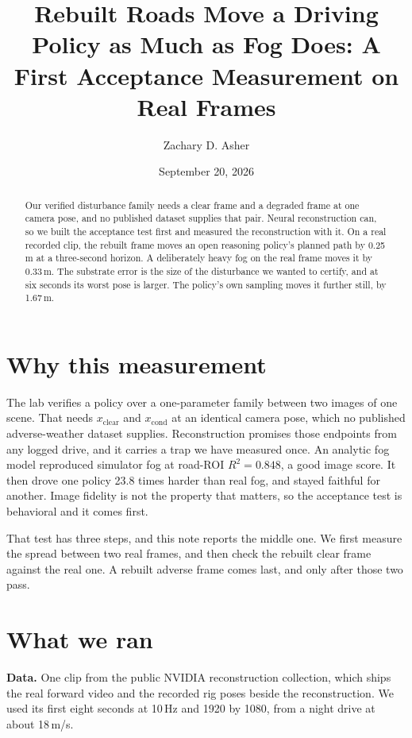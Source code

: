 \documentclass[10pt,twocolumn]{article}
\title{\bfseries\large Rebuilt Roads Move a Driving Policy as Much as Fog Does:
A First Acceptance Measurement on Real Frames}
\author[1]{Zachary D. Asher}
\affil[1]{AD Assurance Lab, Western Michigan University, Kalamazoo, MI, USA}
\date{\vspace{-1.0em}\small September 20, 2026}
\begin{document}
\maketitle

\begin{abstract}
\noindent
Our verified disturbance family needs a clear frame and a degraded frame at one
camera pose, and no published dataset supplies that pair. Neural reconstruction
can, so we built the acceptance test first and measured the reconstruction with
it. On a real recorded clip, the rebuilt frame moves an open reasoning policy's
planned path by 0.25\,m at a three-second horizon. A deliberately heavy fog on
the real frame moves it by 0.33\,m. The substrate error is the size of the
disturbance we wanted to certify, and at six seconds its worst pose is larger. The policy's own sampling moves it further still, by 1.67\,m.
\end{abstract}

\section{Why this measurement}
The lab verifies a policy over a one-parameter family between two images of one
scene. That needs $x_\text{clear}$ and $x_\text{cond}$ at an identical camera
pose, which no published adverse-weather dataset supplies. Reconstruction
promises those endpoints from any logged drive, and it carries a trap we have
measured once. An analytic fog model reproduced simulator fog at road-ROI
$R^2=0.848$, a good image score. It then drove one policy 23.8 times harder than
real fog, and stayed faithful for another. Image fidelity is not the property
that matters, so the acceptance test is behavioral and it comes first.

That test has three steps, and this note reports the middle one. We first
measure the spread between two real frames, and then check the rebuilt clear
frame against the real one. A rebuilt adverse frame comes last, and only after
those two pass.

\section{What we ran}
\textbf{Data.} One clip from the public NVIDIA reconstruction collection, which
ships the real forward video and the recorded rig poses beside the
reconstruction. We used its first eight seconds at 10\,Hz and 1920 by 1080, from a night
drive at about 18\,m/s.
\end{document}

